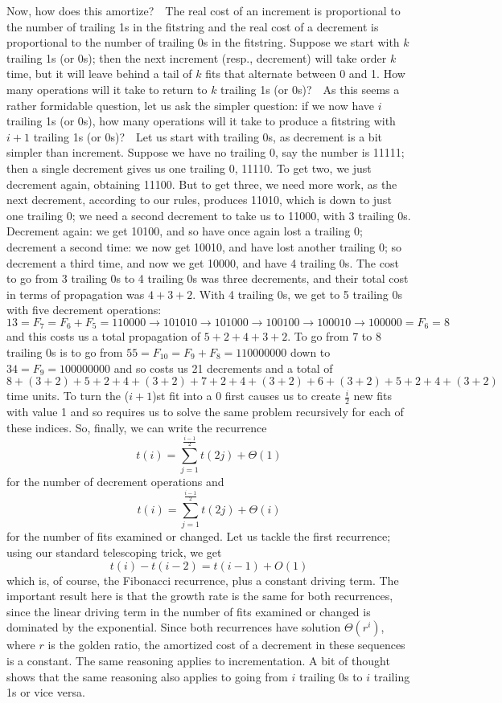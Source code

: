 \documentclass[11pt]{article}
\begin{document}
Now, how does this amortize?\ \ The real cost of an increment is proportional
to the number of trailing 1s in the fitstring and the real cost of a decrement
is proportional to the number of trailing 0s in the fitstring.  Suppose we
start with $k$ trailing 1s (or 0s); then the next increment (resp., decrement)
will take order $k$ time, but it will leave behind a tail of $k$ fits that
alternate between 0 and 1.  How many operations will it take to return to $k$
trailing 1s (or 0s)?\ \ As this seems a rather formidable question, let us ask
the simpler question: if we now have $i$ trailing 1s (or 0s), how many
operations will it take to produce a fitstring with $i+1$ trailing 1s (or 0s)?\
\ Let us start with trailing 0s, as decrement is a bit simpler than increment.
Suppose we have no trailing 0, say the number is 11111; then a single decrement
gives us one trailing 0, 11110.  To get two, we just decrement again, obtaining
11100.  But to get three, we need more work, as the next decrement, according
to our rules, produces 11010, which is down to just one trailing 0; we need a
second decrement to take us to 11000, with 3 trailing 0s.  Decrement again: we
get 10100, and so have once again lost a trailing 0; decrement a second time:
we now get 10010, and have lost another trailing 0; so decrement a third time,
and now we get 10000, and have 4 trailing 0s.  The cost to go from 3 trailing
0s to 4 trailing 0s was three decrements, and their total cost in terms of
propagation was $4+3+2$.  With 4 trailing 0s, we get to 5 trailing 0s with five
decrement operations:
  $$13 = F_7 = F_6+ F_5 = 110000 \rightarrow 101010 \rightarrow 101000 \rightarrow 100100 \rightarrow 100010 \rightarrow 100000 = F_6 = 8$$
and this costs us a total propagation of $5+2+4+3+2$.  To go from 7 to 8
trailing 0s is to go from $55 = F_{10} = F_9 + F_8 = 110000000$ down to $34 =
F_9 = 100000000$ and so costs us 21 decrements and a total of
$8+(3+2)+5+2+4+(3+2)+7+2+4+(3+2)+6+(3+2)+5+2+4+(3+2)$ time units.  To turn the
($i+1$)st fit into a 0 first causes us to create $\frac i2$ new fits with value
1 and so requires us to solve the same problem recursively for each of these
indices.  So, finally, we can write the recurrence
  $$t(i) = \sum_{j=1}^{\frac {i-1}2} t(2j) + \Theta(1)$$
for the number of decrement operations and
  $$t(i) = \sum_{j=1}^{\frac {i-1}2} t(2j) + \Theta(i)$$
for the number of fits examined or changed.  Let us tackle the first
recurrence; using our standard telescoping trick, we get
  $$t(i) - t(i-2) = t(i-1) + O(1)$$
which is, of course, the Fibonacci recurrence, plus a constant driving term.
The important result here is that the growth rate is the same for both
recurrences, since the linear driving term in the number of fits examined or
changed is dominated by the exponential.  Since both recurrences have solution
$\Theta(r^i)$, where $r$ is the golden ratio, the amortized cost of a decrement
in these sequences is a constant.  The same reasoning applies to
incrementation.   A bit of thought shows that the same reasoning also applies
to going from $i$ trailing 0s to $i$ trailing 1s or vice versa.
\end{document}
